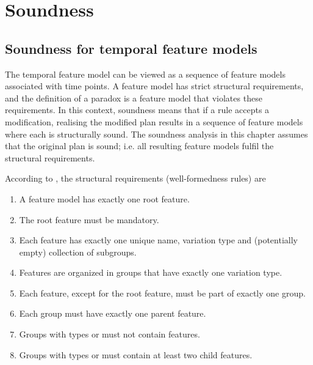 \chapter{Soundness}
\label{cha:soundness}


\section{Soundness for temporal feature models}
\label{sec:soundness-for-temporal-feature-models}
The temporal feature model can be viewed as a sequence of feature models associated with time points. A feature model has strict structural requirements, and the definition of a paradox is a feature model that violates these requirements. In this context, soundness means that if a rule accepts a modification, realising the modified plan results in a sequence of feature models where each is structurally sound. The soundness analysis in this chapter assumes that the original plan is sound; i.e. all resulting feature models fulfil the structural requirements. 

According to \cite{art:consistency-preserving-evolution-planning}, the structural requirements (well-formedness rules) are 
\begin{enumerate}[\itbf{WF\arabic*}, itemsep=0mm]
   \item A feature model has exactly one root feature.
   \item The root feature must be mandatory.
   \item Each feature has exactly one unique name, variation type and (potentially empty) collection of subgroups.
   \item Features are organized in groups that have exactly one variation type.
   \item Each feature, except for the root feature, must be part of exactly one group.
   \item Each group must have exactly one parent feature.
   \item Groups with types \xortype or \ortype must not contain \mandatory features.
   \item Groups with types \xortype or \ortype must contain at least two child features.
\end{enumerate}

